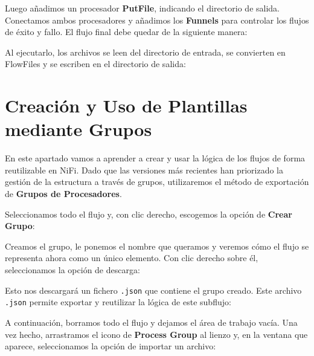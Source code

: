 \documentclass{../../miPlantilla}
\begin{document}
Luego añadimos un procesador \textbf{PutFile}, indicando el directorio de salida. Conectamos ambos procesadores y añadimos los \textbf{Funnels} para controlar los flujos de éxito y fallo.
El flujo final debe quedar de la siguiente manera:


Al ejecutarlo, los archivos se leen del directorio de entrada, se convierten en FlowFiles y se escriben en el directorio de salida:


\newpage

\section{Creación y Uso de Plantillas mediante Grupos}
En este apartado vamos a aprender a crear y usar la lógica de los flujos de forma reutilizable en NiFi. Dado que las versiones más recientes han priorizado la gestión de la estructura a través de grupos, utilizaremos el método de exportación de \textbf{Grupos de Procesadores}.

Seleccionamos todo el flujo y, con clic derecho, escogemos la opción de \textbf{Crear Grupo}:


Creamos el grupo, le ponemos el nombre que queramos y veremos cómo el flujo se representa ahora como un único elemento. Con clic derecho sobre él, seleccionamos la opción de descarga:


\newpage

Esto nos descargará un fichero \texttt{.json} que contiene el grupo creado. Este archivo \texttt{.json} permite exportar y reutilizar la lógica de este subflujo:


A continuación, borramos todo el flujo y dejamos el área de trabajo vacía. Una vez hecho, arrastramos el icono de \textbf{Process Group} al lienzo y, en la ventana que aparece, seleccionamos la opción de importar un archivo:

\begin{figure}[H]
    \centering
    \begin{minipage}{0.1\textwidth}
    \end{minipage}\hfill
    \begin{minipage}{0.8\textwidth}
    \end{minipage}
\end{figure}
\end{document}
